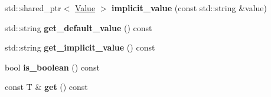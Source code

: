 \begin{DoxyCompactItemize}
\item 
std\+::shared\+\_\+ptr$<$ \hyperlink{classcxxopts_1_1Value}{Value} $>$ {\bfseries implicit\+\_\+value} (const std\+::string \&value)\hypertarget{classcxxopts_1_1values_1_1abstract__value_aa7de3f6793ddca0597ff210ded8f67b7}{}\label{classcxxopts_1_1values_1_1abstract__value_aa7de3f6793ddca0597ff210ded8f67b7}

\item 
std\+::string {\bfseries get\+\_\+default\+\_\+value} () const \hypertarget{classcxxopts_1_1values_1_1abstract__value_a6890baa44ee17b314b0c81e4fa069707}{}\label{classcxxopts_1_1values_1_1abstract__value_a6890baa44ee17b314b0c81e4fa069707}

\item 
std\+::string {\bfseries get\+\_\+implicit\+\_\+value} () const \hypertarget{classcxxopts_1_1values_1_1abstract__value_abdbbdd94ec672f71f582b59f26ae1e0f}{}\label{classcxxopts_1_1values_1_1abstract__value_abdbbdd94ec672f71f582b59f26ae1e0f}

\item 
bool {\bfseries is\+\_\+boolean} () const \hypertarget{classcxxopts_1_1values_1_1abstract__value_a6029e34b333901c73efaa6a954c3ad23}{}\label{classcxxopts_1_1values_1_1abstract__value_a6029e34b333901c73efaa6a954c3ad23}

\item 
const T \& {\bfseries get} () const \hypertarget{classcxxopts_1_1values_1_1abstract__value_a5f24c0e82231e2fec9e89c222aef78ad}{}\label{classcxxopts_1_1values_1_1abstract__value_a5f24c0e82231e2fec9e89c222aef78ad}

\end{DoxyCompactItemize}
